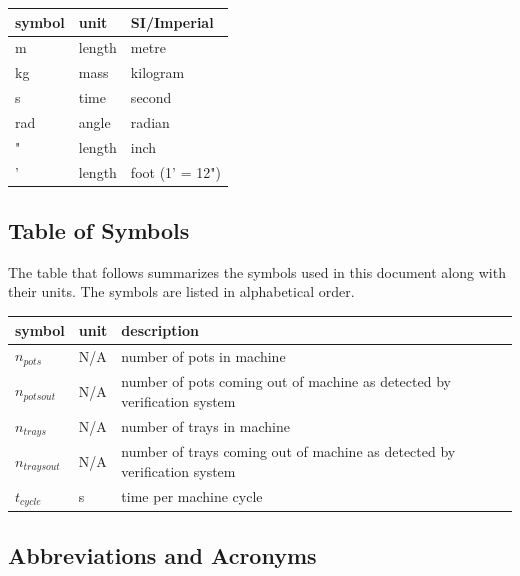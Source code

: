 \documentclass[12pt]{article}
\begin{document}
\renewcommand{\arraystretch}{1.2}
  \noindent \begin{tabular}{l l l} 
    \toprule		
    \textbf{symbol} & \textbf{unit} & \textbf{SI/Imperial}\\
    \midrule 
    \si{\metre} & length & metre\\
    \si{\kilogram} & mass	& kilogram\\
    \si{\second} & time & second\\
    \si{\radian} & angle & radian\\
    {"} & length & inch\\
    {'} & length & foot (1' = 12")\\
    \bottomrule
  \end{tabular}

\subsection{Table of Symbols}

The table that follows summarizes the symbols used in this document along with
their units. The symbols are listed in alphabetical order.

\renewcommand{\arraystretch}{1.2}
\noindent \begin{longtable*}{l l p{12cm}} \toprule
\textbf{symbol} & \textbf{unit} & \textbf{description}\\
\midrule 
$n_{pots}$ & N/A & number of pots in machine
\\
$n_{potsout}$ & N/A & number of pots coming out of machine
as detected by verification system
\\
$n_{trays}$ & N/A & number of trays in machine
\\
$n_{traysout}$ & N/A & number of trays coming out of machine
as detected by verification system
\\
$t_{cycle}$ & \si{\second} & time per machine cycle
\\ 
\bottomrule
\end{longtable*}

\subsection{Abbreviations and Acronyms}
\end{document}
